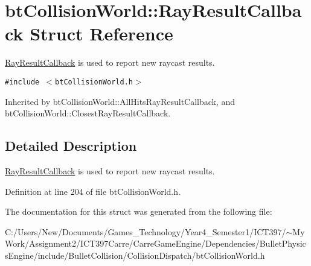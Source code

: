 \hypertarget{structbt_collision_world_1_1_ray_result_callback}{
\section{btCollisionWorld::RayResultCallback Struct Reference}
\label{structbt_collision_world_1_1_ray_result_callback}
}
\hyperlink{structbt_collision_world_1_1_ray_result_callback}{RayResultCallback} is used to report new raycast results.  


{\tt \#include $<$btCollisionWorld.h$>$}

Inherited by btCollisionWorld::AllHitsRayResultCallback, and btCollisionWorld::ClosestRayResultCallback.



\subsection{Detailed Description}
\hyperlink{structbt_collision_world_1_1_ray_result_callback}{RayResultCallback} is used to report new raycast results. 

Definition at line 204 of file btCollisionWorld.h.

The documentation for this struct was generated from the following file:\begin{CompactItemize}
\item 
C:/Users/New/Documents/Games\_\-Technology/Year4\_\-Semester1/ICT397/$\sim$My Work/Assignment2/ICT397Carre/CarreGameEngine/Dependencies/BulletPhysicsEngine/include/BulletCollision/CollisionDispatch/btCollisionWorld.h\end{CompactItemize}

